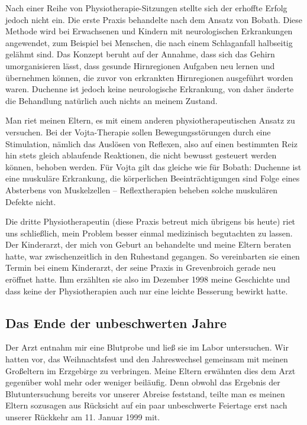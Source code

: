 \documentclass[fontsize=14pt,a4paper,headinclude,DIV=calc,automark]{scrbook}
\begin{document}
Nach einer Reihe von Physiotherapie-Sitzungen stellte sich der erhoffte Erfolg jedoch nicht ein. Die erste Praxis behandelte nach dem Ansatz von Bobath. Diese Methode wird bei Erwachsenen und Kindern mit neurologischen Erkrankungen angewendet, zum Beispiel bei Menschen, die nach einem Schlaganfall halbseitig gelähmt sind. Das Konzept beruht auf der Annahme, dass sich das Gehirn umorganisieren lässt, dass gesunde Hirnregionen Aufgaben neu lernen und übernehmen können, die zuvor von erkrankten Hirnregionen ausgeführt worden waren. Duchenne ist jedoch keine neurologische Erkrankung, von daher änderte die Behandlung natürlich auch nichts an meinem Zustand.

Man riet meinen Eltern, es mit einem anderen physiotherapeutischen Ansatz zu versuchen. Bei der Vojta-Therapie sollen Bewegungsstörungen durch eine Stimulation, nämlich das Auslösen von Reflexen, also auf einen bestimmten Reiz hin stets gleich ablaufende Reaktionen, die nicht bewusst gesteuert werden können, behoben werden. Für Vojta gilt das gleiche wie für Bobath: Duchenne ist eine muskuläre Erkrankung, die körperlichen Beeinträchtigungen sind Folge eines Absterbens von Muskelzellen – Reflextherapien beheben solche muskulären Defekte nicht.

Die dritte Physiotherapeutin (diese Praxis betreut mich übrigens bis heute) riet uns schließlich, mein Problem besser einmal medizinisch begutachten zu lassen. Der Kinderarzt, der mich von Geburt an behandelte und meine Eltern beraten hatte, war zwischenzeitlich in den Ruhestand gegangen. So vereinbarten sie einen Termin bei einem Kinderarzt, der seine Praxis in Grevenbroich gerade neu eröffnet hatte. Ihm erzählten sie also im Dezember 1998 meine Geschichte und dass keine der Physiotherapien auch nur eine leichte Besserung bewirkt hatte.

\subsection{Das Ende der unbeschwerten Jahre}

Der Arzt entnahm mir eine Blutprobe und ließ sie im Labor untersuchen. Wir hatten vor, das Weihnachtsfest und den Jahreswechsel gemeinsam mit meinen Großeltern im Erzgebirge zu verbringen. Meine Eltern erwähnten dies dem Arzt gegenüber wohl mehr oder weniger beiläufig. Denn obwohl das Ergebnis der Blutuntersuchung bereits vor unserer Abreise feststand, teilte man es meinen Eltern sozusagen aus Rücksicht auf ein paar unbeschwerte Feiertage erst nach unserer Rückkehr am 11. Januar 1999 mit.
\end{document}
